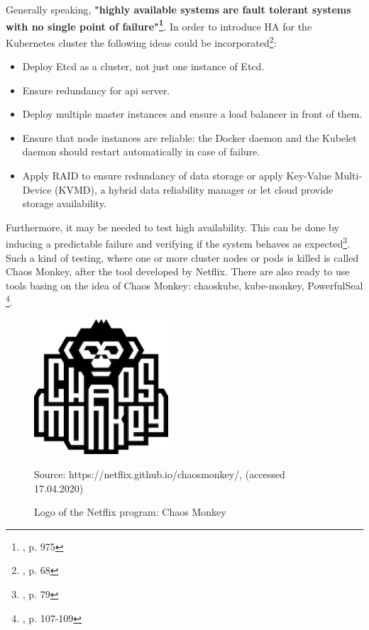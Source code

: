 Generally speaking, \textbf{"highly available systems are fault tolerant systems with no single point of failure"\footnote{\cite{article-redundancy-models}, p. 975}}. In order to introduce HA for the Kubernetes cluster the following ideas could be incorporated\footnote{\cite{book-mastering-k8s}, p. 68}:
\begin{itemize}
\item Deploy Etcd as a cluster, not just one instance of Etcd.
\item Ensure redundancy for api server.
\item Deploy multiple master instances and ensure a load balancer in front of them.
\item Ensure that node instances are reliable: the Docker daemon and the Kubelet daemon should restart automatically in case of failure.
\item Apply RAID to ensure redundancy of data storage or apply Key-Value Multi-Device (KVMD), a hybrid data reliability manager\cite{data-rel-kv} or let cloud provide storage availability.
\end{itemize}

Furthermore, it may be needed to test high availability. This can be done by inducing a predictable failure and verifying if the system behaves as expected\footnote{\cite{book-mastering-k8s}, p. 79}. Such a kind of testing, where one or more cluster nodes or pods is killed is called Chaos Monkey, after the tool developed by Netflix. There are also ready to use tools basing on the idea of Chaos Monkey: chaoskube, kube-monkey, PowerfulSeal \footnote{\cite{book-cndwk}, p. 107-109}.
\begin{figure}[H]
    \centering
    \includegraphics[width=5cm]{figures/chaos-monkey-logo.png}
    \label{fig:chaos-monkey-logo}
    \caption{Logo of the Netflix program: Chaos Monkey}
    \small{Source: https://netflix.github.io/chaosmonkey/, (accessed 17.04.2020)}
\end{figure}

